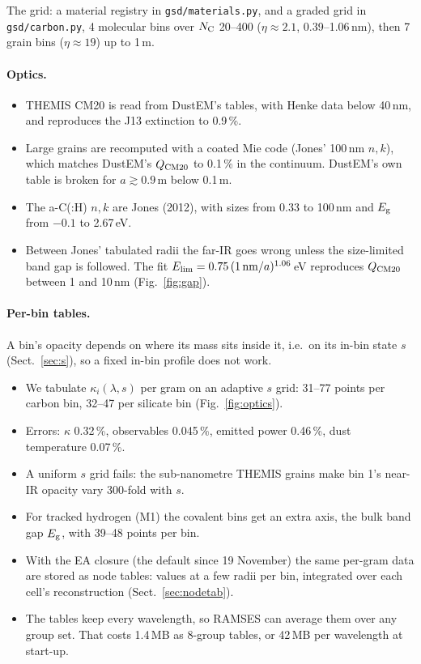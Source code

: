 \documentclass[11pt,a4paper]{article}
\newcommand{\NC}{N_{\rm C}}
\newcommand{\Eg}{E_{\rm g}}
\begin{document}
The grid: a material registry in \texttt{gsd/materials.py}, and a graded grid in \texttt{gsd/carbon.py}, 4 molecular
bins over $\NC$ 20--400 ($\eta \approx 2.1$, 0.39--1.06\,nm), then 7 grain bins ($\eta \approx 19$) up to 1\,\textmu m.

\paragraph{Optics.}
\begin{itemize}
\item THEMIS CM20 is read from DustEM's tables, with Henke data below 40\,nm, and reproduces the J13 extinction to 0.9\,\%.
\item Large grains are recomputed with a coated Mie code (Jones' 100\,nm $n,k$), which matches DustEM's $Q_{\rm CM20}$
  to 0.1\,\% in the continuum. DustEM's own table is broken for $a \gtrsim 0.9$\,\textmu m below 0.1\,\textmu m.
\item The a-C(:H) $n,k$ are Jones (2012), with sizes from 0.33 to 100\,nm and $\Eg$ from $-0.1$ to 2.67\,eV.
\item Between Jones' tabulated radii the far-IR goes wrong unless the size-limited band gap is followed. The fit
  $E_{\rm lim} = 0.75\,(1\,{\rm nm}/a)^{1.06}$\,eV reproduces $Q_{\rm CM20}$ between 1 and 10\,nm (Fig.~\ref{fig:gap}).
\end{itemize}

\paragraph{Per-bin tables.} A bin's opacity depends on where its mass sits inside it, i.e.\ on its in-bin state $s$
(Sect.~\ref{sec:s}), so a fixed in-bin profile does not work.
\begin{itemize}
\item We tabulate $\kappa_i(\lambda, s)$ per gram on an adaptive $s$ grid: 31--77 points per carbon bin, 32--47 per
  silicate bin (Fig.~\ref{fig:optics}).
\item Errors: $\kappa$ 0.32\,\%, observables 0.045\,\%, emitted power 0.46\,\%, dust temperature 0.07\,\%.
\item A uniform $s$ grid fails: the sub-nanometre THEMIS grains make bin 1's near-IR opacity vary 300-fold with $s$.
\item For tracked hydrogen (M1) the covalent bins get an extra axis, the bulk band gap $\Eg$, with 39--48 points per bin.
\item With the EA closure (the default since 19 November) the same per-gram data are stored as node tables: values at a
  few radii per bin, integrated over each cell's reconstruction (Sect.~\ref{sec:nodetab}).
\item The tables keep every wavelength, so RAMSES can average them over any group set. That costs 1.4\,MB as 8-group
  tables, or 42\,MB per wavelength at start-up.
\end{itemize}
\end{document}
